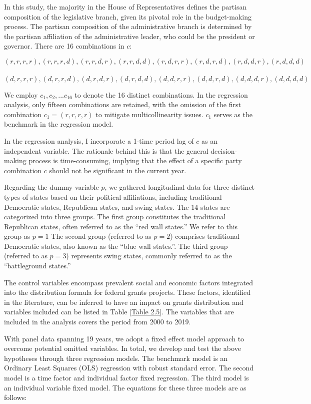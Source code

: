 In this study, the majority in the House of Representatives defines the partisan composition of the legislative branch, given its pivotal role in the budget-making process. The partisan composition of the administrative branch is determined by the partisan affiliation of the administrative leader, who
could be the president or governor. There are 16 combinations in $c$:

$$(r, r, r, r), (r, r, r, d), (r, r, d, r), (r, r, d, d), (r, d, r, r), (r, d, r, d), (r, d, d, r), (r, d, d, d)$$\\$$(d, r, r, r), (d, r, r, d), (d, r, d, r), (d, r, d, d), (d, d, r, r), (d, d, r, d), (d, d, d, r), (d, d, d, d) $$

We employ $c_1, c_2, . . . c_{16}$ to denote the 16 distinct combinations. In the regression analysis, only fifteen combinations are retained, with the omission of the first combination $c_1 = (r, r, r, r)$ to mitigate multicollinearity issues. $c_1$ serves as the benchmark in the regression model.


In the regression analysis, I incorporate a 1-time period lag of $c$ as an independent variable. The rationale behind this is that the general decision-making process is time-consuming, implying that the effect of a specific party combination $c$ should not be significant in the current year.

Regarding the dummy variable $p$, we gathered longitudinal data for three distinct types of states based on their political affiliations, including traditional Democratic states, Republican states, and
swing states. The 14 states are categorized into three groups. The first group constitutes the traditional Republican states, often referred to as the “red wall states.” We refer to this group as $p = 1$ The second group (referred to as $p = 2$) comprises traditional Democratic states, also known as
the “blue wall states.”. The third group (referred to as $p = 3$) represents swing states, commonly referred to as the “battleground states.”

The control variables encompass prevalent social and economic factors integrated into the distribution formula for federal grants projects. These factors, identified in the literature, can be inferred to have an impact on grants distribution and variables included can be listed in Table \ref{Table 2.5}. The variables that are included in the analysis covers the period from 2000 to 2019.

With panel data spanning 19 years, we adopt a fixed effect model approach to overcome potential omitted variables. In total, we develop and test the above hypotheses through three regression models. The benchmark model is an Ordinary Least Squares (OLS) regression with robust standard error. The second model is a time factor and individual factor fixed regression. The third model is
an individual variable fixed model. The equations for these three models are as follows:

